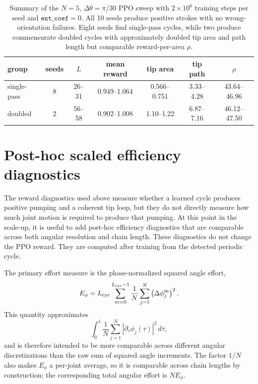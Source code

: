 \documentclass[11pt]{article}
\begin{document}
\begin{table}[htbp]
\centering
\begin{tabular}{lcccccc}
\hline
group & seeds & $L$ & mean reward & tip area & tip path & $\rho$ \\
\hline
single-pass & 8 & 26--31 & 0.949--1.064 & 0.566--0.751 & 3.33--4.28 & 43.64--46.96 \\
doubled & 2 & 56--58 & 0.902--1.008 & 1.10--1.22 & 6.87--7.16 & 46.12--47.50 \\
\hline
\end{tabular}
\caption{Summary of the $N=5$, $\Delta\theta=\pi/30$ PPO sweep with
$2\times 10^6$ training steps per seed and $\texttt{ent\_coef}=0$.
 All 10 seeds produce positive strokes with no
wrong-orientation failures. Eight seeds find single-pass cycles, while two
produce commensurate doubled cycles with approximately doubled tip area and path
length but comparable reward-per-area $\rho$.
}
\label{tab:n5-pi30-summary}
\end{table}


\section{Post-hoc scaled efficiency diagnostics}

The reward diagnostics used above measure whether a learned cycle produces positive pumping and a coherent tip loop, but they do not directly measure how much joint motion is required to produce that pumping. At this point in the scale-up, it is useful to add post-hoc efficiency diagnostics that are comparable across both angular resolution and chain length. These diagnostics do not change the PPO reward. They are computed after training from the detected periodic cycle.

The primary effort measure is the phase-normalized squared angle effort,
\begin{equation}
E_\phi
= L_{\rm cyc}
\sum_{m=0}^{L_{\rm cyc}-1}
\frac{1}{N}
\sum_{j=1}^N
\left(\Delta \phi_j^m\right)^2 .
\end{equation}
This quantity approximates
\begin{equation}
\int_0^1
\frac{1}{N}
\sum_{j=1}^N
\left|\partial_\tau \phi_j(\tau)\right|^2
\, d\tau ,
\end{equation}
and is therefore intended to be more comparable across different angular discretizations than the raw sum of squared angle increments. The factor $1/N$ also makes $E_\phi$ a per-joint average, so it is comparable across chain lengths by construction; the corresponding total angular effort is $N E_\phi$.
\end{document}
